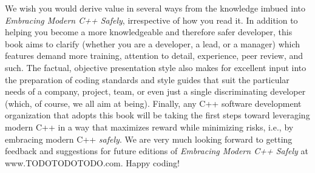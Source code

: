 We wish you would derive value in several ways from the knowledge imbued into \textit{Embracing Modern C++ Safely}, irrespective of how you read it. In addition to helping you become a more knowledgeable and therefore safer developer, this book aims to clarify (whether you are a developer, a lead, or a manager) which features demand more training, attention to detail, experience, peer review, and such. The factual, objective presentation style also makes for excellent input into the preparation of coding standards and style guides that suit the particular needs of a company, project, team, or even just a single discriminating developer (which, of course, we all aim at being). Finally, any C++ software development organization that adopts this book will be taking the first steps toward leveraging modern C++ in a way that maximizes reward while minimizing risks, i.e., by embracing modern C++ \textit{safely}. We are very much looking forward to getting feedback and suggestions for future editions of \textit{Embracing Modern C++ Safely} at www.TODOTODOTODO.com. Happy coding!

